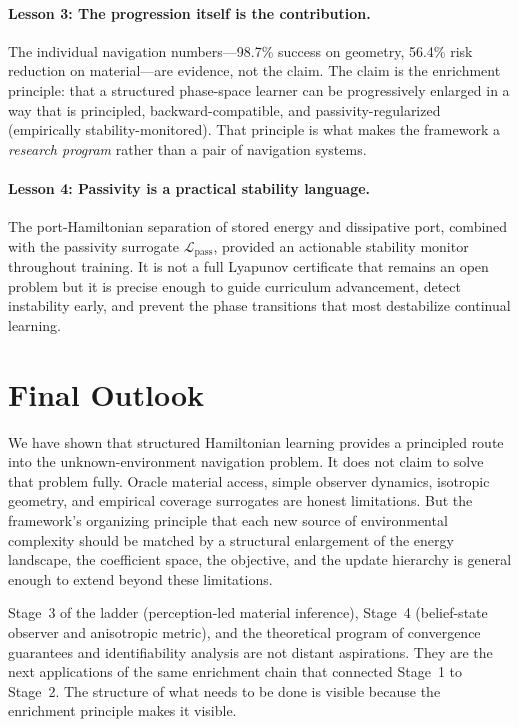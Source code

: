 \paragraph{Lesson 3: The progression itself is the contribution.}
The individual navigation numbers—98.7\% success on geometry, 56.4\%
risk reduction on material—are evidence, not the claim.
The claim is the enrichment principle: that a structured phase-space
learner can be progressively enlarged in a way that is principled,
backward-compatible, and passivity-regularized (empirically stability-monitored).
That principle is what makes the framework a \emph{research program}
rather than a pair of navigation systems.

\paragraph{Lesson 4: Passivity is a practical stability language.}
The port-Hamiltonian separation of stored energy and dissipative port,
combined with the passivity surrogate $\mathcal{L}_{\mathrm{pass}}$,
provided an actionable stability monitor throughout training.
It is not a full Lyapunov certificate that remains an open problem 
but it is precise enough to guide curriculum advancement, detect
instability early, and prevent the phase transitions that most
destabilize continual learning.

\section{Final Outlook}
\label{sec:ch8:outlook}

We have shown that structured Hamiltonian learning provides a
principled route into the unknown-environment navigation problem.
It does not claim to solve that problem fully.
Oracle material access, simple observer dynamics, isotropic geometry,
and empirical coverage surrogates are honest limitations.
But the framework's organizing principle that each new source of
environmental complexity should be matched by a structural enlargement
of the energy landscape, the coefficient space, the objective, and the
update hierarchy is general enough to extend beyond these limitations.

Stage~3 of the ladder (perception-led material inference), Stage~4
(belief-state observer and anisotropic metric), and the theoretical
program of convergence guarantees and identifiability analysis are
not distant aspirations.
They are the next applications of the same enrichment chain that
connected Stage~1 to Stage~2.
The structure of what needs to be done is visible because the
enrichment principle makes it visible.

